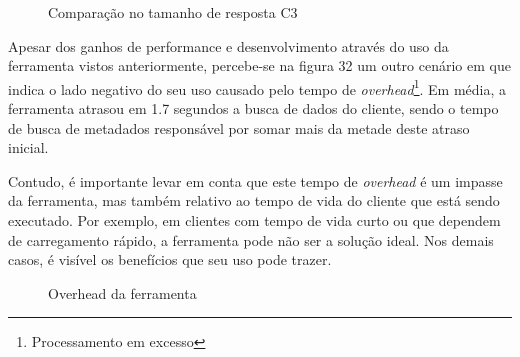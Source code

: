 \begin{figure}[H]
  \centering
  \caption{Comparação no tamanho de resposta C3}
\end{figure}

Apesar dos ganhos de performance e desenvolvimento através do uso da ferramenta vistos anteriormente, percebe-se na figura 32 um outro cenário em que indica o lado negativo do seu uso causado pelo tempo de \textit{overhead}\footnote{
  Processamento em excesso
}. Em média, a ferramenta atrasou em 1.7 segundos a busca de dados do cliente, sendo o tempo de busca de metadados responsável por somar mais da metade deste atraso inicial.

Contudo, é importante levar em conta que este tempo de \textit{overhead} é um impasse da ferramenta, mas também relativo ao tempo de vida do cliente que está sendo executado. Por exemplo, em clientes com tempo de vida curto ou que dependem de carregamento rápido, a ferramenta pode não ser a solução ideal. Nos demais casos, é visível os benefícios que seu uso pode trazer. 

\begin{figure}[H]
  \centering
  \caption{Overhead da ferramenta}
\end{figure}
